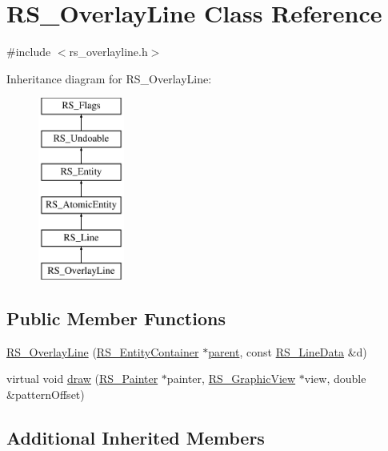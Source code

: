 \hypertarget{classRS__OverlayLine}{\section{R\-S\-\_\-\-Overlay\-Line Class Reference}
\label{classRS__OverlayLine}
}


{\ttfamily \#include $<$rs\-\_\-overlayline.\-h$>$}

Inheritance diagram for R\-S\-\_\-\-Overlay\-Line\-:\begin{figure}[H]
\begin{center}
\leavevmode
\includegraphics[height=6.000000cm]{classRS__OverlayLine}
\end{center}
\end{figure}
\subsection*{Public Member Functions}
\begin{DoxyCompactItemize}
\item 
\hyperlink{classRS__OverlayLine_a8539a7f5465edd05c6a84e3f10d585fc}{R\-S\-\_\-\-Overlay\-Line} (\hyperlink{classRS__EntityContainer}{R\-S\-\_\-\-Entity\-Container} $\ast$\hyperlink{classRS__Entity_a80358a8d2fc6739a516a278dc500b49f}{parent}, const \hyperlink{classRS__LineData}{R\-S\-\_\-\-Line\-Data} \&d)
\item 
virtual void \hyperlink{classRS__OverlayLine_a5c075fcd0ff5eaf35d480ccc0873ced1}{draw} (\hyperlink{classRS__Painter}{R\-S\-\_\-\-Painter} $\ast$painter, \hyperlink{classRS__GraphicView}{R\-S\-\_\-\-Graphic\-View} $\ast$view, double \&pattern\-Offset)
\end{DoxyCompactItemize}
\subsection*{Additional Inherited Members}


